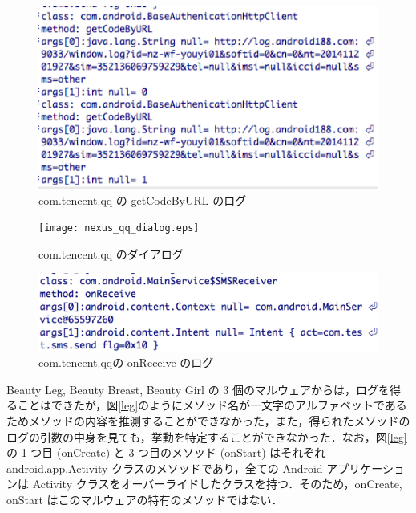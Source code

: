 \begin{figure}[t]
\begin{center}
\graphicspath{{./epsfiles/}}
\includegraphics[scale=0.5]{baseauthentication_qq.eps}
\end{center}
\caption{com.tencent.qq の getCodeByURL のログ}
\label{qqauthentication}
\end{figure}


\begin{figure}[t]
\begin{center}
\graphicspath{{./epsfiles/}}
\texttt{[image: nexus\_qq\_dialog.eps]}
\end{center}
\caption{com.tencent.qq のダイアログ}
\label{dialog}
\end{figure}

\begin{figure}[t]
\begin{center}
\graphicspath{{./epsfiles/}}
\includegraphics[scale=0.3]{SmsReceiver_qq.eps}
\end{center}
\caption{com.tencent.qqの onReceive のログ}
\label{qqreceive}
\end{figure}

Beauty Leg, Beauty Breast, Beauty Girl の 3 個のマルウェアからは，ログを得ることはできたが，図\ref{leg}のようにメソッド名が一文字のアルファベットであるためメソッドの内容を推測することができなかった，また，得られたメソッドのログの引数の中身を見ても，挙動を特定することができなかった．なお，図\ref{leg}の 1 つ目 (onCreate) と 3 つ目のメソッド (onStart) はそれぞれ android.app.Activity クラスのメソッドであり，全ての Android アプリケーションは Activity クラスをオーバーライドしたクラスを持つ．そのため，onCreate, onStart はこのマルウェアの特有のメソッドではない．

